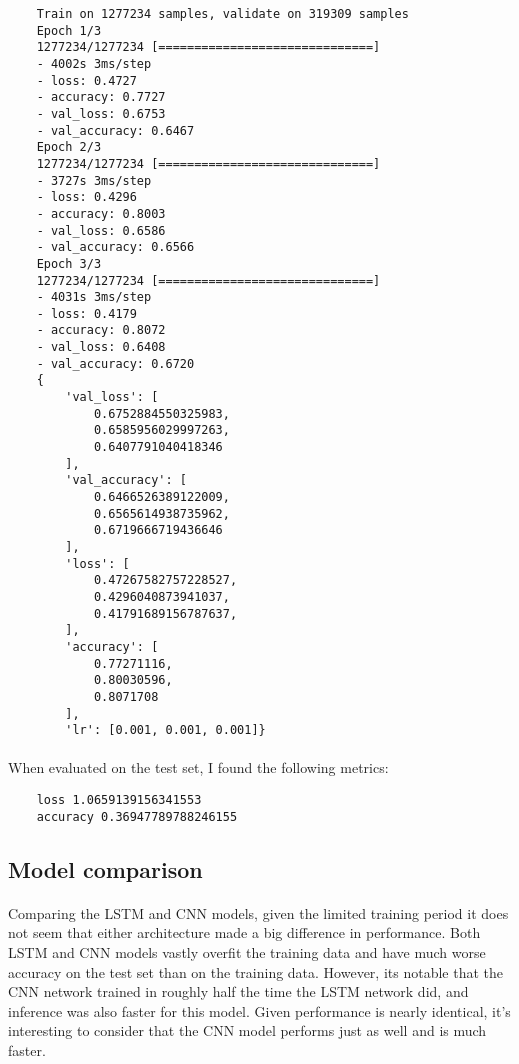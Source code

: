 \documentclass{article}
\begin{document}
\begin{verbatim}
    Train on 1277234 samples, validate on 319309 samples
    Epoch 1/3
    1277234/1277234 [==============================]
    - 4002s 3ms/step
    - loss: 0.4727
    - accuracy: 0.7727
    - val_loss: 0.6753
    - val_accuracy: 0.6467
    Epoch 2/3
    1277234/1277234 [==============================]
    - 3727s 3ms/step
    - loss: 0.4296
    - accuracy: 0.8003
    - val_loss: 0.6586
    - val_accuracy: 0.6566
    Epoch 3/3
    1277234/1277234 [==============================]
    - 4031s 3ms/step
    - loss: 0.4179
    - accuracy: 0.8072
    - val_loss: 0.6408
    - val_accuracy: 0.6720
    {
        'val_loss': [
            0.6752884550325983,
            0.6585956029997263,
            0.6407791040418346
        ],
        'val_accuracy': [
            0.6466526389122009,
            0.6565614938735962,
            0.6719666719436646
        ],
        'loss': [
            0.47267582757228527,
            0.4296040873941037,
            0.41791689156787637,
        ],
        'accuracy': [
            0.77271116,
            0.80030596,
            0.8071708
        ],
        'lr': [0.001, 0.001, 0.001]}
\end{verbatim}

\paragraph{} When evaluated on the test set, I found the following metrics:

\begin{verbatim}
    loss 1.0659139156341553
    accuracy 0.36947789788246155
\end{verbatim}

\subsection{Model comparison}

\paragraph{} Comparing the LSTM and CNN models, given the limited training period it does not seem that either architecture made a big difference in performance. Both LSTM and CNN models vastly overfit the training data and have much worse accuracy on the test set than on the training data. However, its notable that the CNN network trained in roughly half the time the LSTM network did, and inference was also faster for this model. Given performance is nearly identical, it's interesting to consider that the CNN model performs just as well and is much faster.
\end{document}
